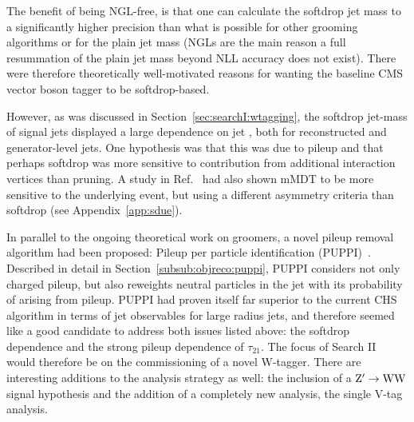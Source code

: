 The benefit of being NGL-free, is that one can calculate the softdrop jet mass to a significantly higher precision than what is possible for other grooming algorithms or for the plain jet mass (NGLs are the main reason a full resummation of the plain jet mass beyond NLL accuracy does not exist). There were therefore theoretically well-motivated reasons for wanting the baseline CMS vector boson tagger to be softdrop-based.\par 
However, as was discussed in Section~\ref{sec:searchI:wtagging}, the softdrop jet-mass of signal jets displayed a large dependence on jet \PT, both for reconstructed and generator-level jets. One hypothesis was that this was due to pileup and that perhaps softdrop was more sensitive to contribution from additional interaction vertices than pruning. A study in Ref.~\cite{Dasgupta:2015yua} had also shown mMDT to be more sensitive to the underlying event, but using a different asymmetry criteria than softdrop (see Appendix~\ref{app:sdue}).\par
In parallel to the ongoing theoretical work on groomers, a novel pileup removal algorithm had been proposed: Pileup per particle identification (PUPPI)~\cite{Bertolini2014}. Described in detail in Section~\ref{subsub:objreco:puppi}, PUPPI considers not only charged pileup, but also reweights neutral particles in the jet with its probability of arising from pileup. PUPPI had proven itself far superior to the current CHS algorithm in terms of jet observables for large radius jets, and therefore seemed like a good candidate to address both issues listed above: the softdrop \PT dependence and the strong pileup dependence of $\tau_{21}$. The focus of Search II would therefore be on the commissioning of a novel W-tagger. There are interesting additions to the analysis strategy as well: the inclusion of a $\mathrm{Z}^\prime \rightarrow \mathrm{W}\mathrm{W}$ signal hypothesis and the addition of a completely new analysis, the single V-tag analysis.

